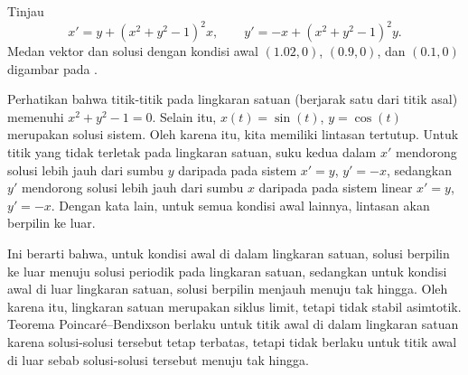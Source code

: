 \begin{example}
Tinjau
\begin{equation*}
x' = y + {(x^2+y^2-1)}^2 x, \qquad
y' = -x + {(x^2+y^2-1)}^2 y.
\end{equation*}
Medan vektor dan solusi dengan kondisi awal
$(1.02,0)$, $(0.9,0)$, dan $(0.1,0)$ digambar pada
.

\begin{myfig}
\capstart
{}
\caption{Contoh siklus limit tak stabil.\label{fig:nlin-unstable-limit-cycle}}
\end{myfig}

Perhatikan bahwa titik-titik pada lingkaran satuan (berjarak satu dari titik
asal) memenuhi $x^2+y^2-1=0$. Selain itu, $x(t) = \sin(t)$,
$y = \cos(t)$ merupakan solusi sistem. Oleh karena itu, kita memiliki
lintasan tertutup.
Untuk titik yang tidak terletak pada lingkaran satuan, suku kedua dalam $x'$ mendorong solusi
lebih jauh dari sumbu $y$ daripada pada sistem $x' = y$, $y' = -x$, sedangkan
$y'$ mendorong solusi lebih jauh dari sumbu $x$ daripada pada sistem linear
$x'=y$, $y' = -x$. Dengan kata lain, untuk semua kondisi awal lainnya,
lintasan akan berpilin ke luar.

Ini berarti bahwa, untuk kondisi awal di dalam lingkaran satuan, solusi
berpilin ke luar menuju solusi periodik pada lingkaran satuan, sedangkan untuk
kondisi awal di luar lingkaran satuan, solusi berpilin menjauh menuju tak
hingga. Oleh karena itu, lingkaran satuan merupakan siklus limit, tetapi tidak
stabil asimtotik.
Teorema Poincar\'e--Bendixson berlaku untuk titik awal di dalam lingkaran
satuan karena solusi-solusi tersebut tetap terbatas, tetapi tidak berlaku
untuk titik awal di luar sebab solusi-solusi tersebut menuju tak hingga.
\end{example}

